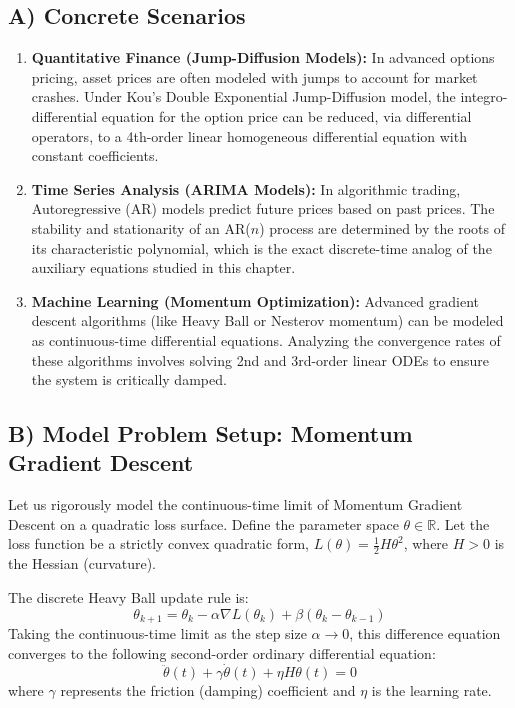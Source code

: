 \documentclass[11pt]{article}
\begin{document}
\subsection{A) Concrete Scenarios}
\begin{enumerate}
    \item \textbf{Quantitative Finance (Jump-Diffusion Models):} In advanced options pricing, asset prices are often modeled with jumps to account for market crashes. Under Kou's Double Exponential Jump-Diffusion model, the integro-differential equation for the option price can be reduced, via differential operators, to a 4th-order linear homogeneous differential equation with constant coefficients.
    \item \textbf{Time Series Analysis (ARIMA Models):} In algorithmic trading, Autoregressive (AR) models predict future prices based on past prices. The stability and stationarity of an AR($n$) process are determined by the roots of its characteristic polynomial, which is the exact discrete-time analog of the auxiliary equations studied in this chapter.
    \item \textbf{Machine Learning (Momentum Optimization):} Advanced gradient descent algorithms (like Heavy Ball or Nesterov momentum) can be modeled as continuous-time differential equations. Analyzing the convergence rates of these algorithms involves solving 2nd and 3rd-order linear ODEs to ensure the system is critically damped.
\end{enumerate}

\subsection{B) Model Problem Setup: Momentum Gradient Descent}
Let us rigorously model the continuous-time limit of Momentum Gradient Descent on a quadratic loss surface.
Define the parameter space $\theta \in \mathbb{R}$. Let the loss function be a strictly convex quadratic form, $L(\theta) = \frac{1}{2} H \theta^2$, where $H > 0$ is the Hessian (curvature).

The discrete Heavy Ball update rule is:
\[ \theta_{k+1} = \theta_k - \alpha \nabla L(\theta_k) + \beta (\theta_k - \theta_{k-1}) \]
Taking the continuous-time limit as the step size $\alpha \to 0$, this difference equation converges to the following second-order ordinary differential equation:
\[ \ddot{\theta}(t) + \gamma \dot{\theta}(t) + \eta H \theta(t) = 0 \]
where $\gamma$ represents the friction (damping) coefficient and $\eta$ is the learning rate.
\end{document}
